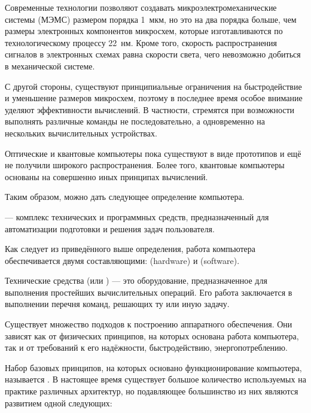 Современные технологии позволяют создавать микроэлектромеханические
системы (МЭМС) размером порядка 1~мкм, но это на два порядка больше,
чем размеры электронных компонентов микросхем, которые изготавливаются
по технологическому процессу 22~нм. Кроме того, скорость
распространения сигналов в электронных схемах равна скорости света,
чего невозможно добиться в механической системе.

С другой стороны, существуют принципиальные ограничения на
быстродействие и уменьшение размеров микросхем, поэтому в последнее
время особое внимание уделяют эффективности вычислений. В частности,
стремятся при возможности выполнять различные команды не
последовательно, а одновременно на нескольких вычислительных
устройствах.

Оптические и квантовые компьютеры пока существуют в виде прототипов и
ещё не получили широкого распространения. Более того, квантовые
компьютеры основаны на совершенно иных принципах вычислений.

Таким образом, можно дать следующее определение компьютера.

\begin{defn}
   — комплекс технических и программных
  средств, предназначенный для автоматизации подготовки и решения
  задач пользователя.
\end{defn}

Как следует из приведённого выше определения, работа компьютера
обеспечивается двумя составляющими:
 (hardware) и
 (software).

Технические средства (или ) — это оборудование, предназначенное для выполнения
простейших вычислительных операций. Его работа заключается в
выполнении перечня команд, решающих ту или иную задачу.


Существует множество подходов к построению аппаратного
обеспечения. Они зависят как от физических принципов, на которых
основана работа компьютера, так и от требований к его надёжности,
быстродействию, энергопотреблению.

Набор базовых принципов, на которых основано функционирование
компьютера, называется . В
настоящее время существует большое количество используемых на практике
различных архитектур, но подавляющее большинство из них являются
развитием одной следующих:

